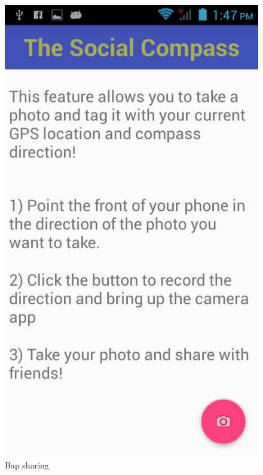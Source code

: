\documentclass[12pt]{article}
\begin{document}
\begin{figure}[H]
\begin{minipage}[b]{.3\textwidth}
        \includegraphics[scale=1.2, width=\linewidth]{photo1.png}  
        \caption{Bap sharing}  
    \end{minipage}  
\end{figure}




\vspace{\baselineskip}



\end{document}
